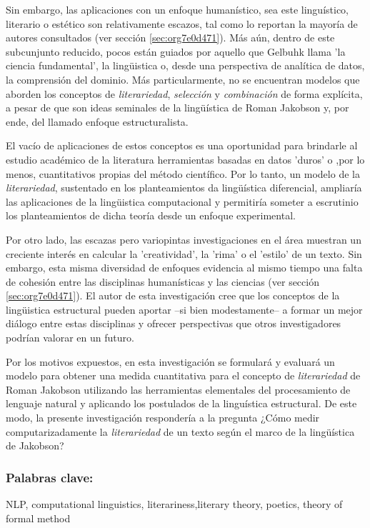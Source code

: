 \documentclass[12pt,letterpaper,twoside]{article}
\begin{document}
Sin embargo, las aplicaciones con un enfoque humanístico, sea este
linguístico, literario o estético son relativamente escazos, tal como
lo reportan la mayoría de autores consultados (ver sección \ref{sec:org7e0d471}).  Más aún, dentro de este subcunjunto reducido, pocos
están guiados por aquello que Gelbuhk llama 'la ciencia fundamental',
la lingüistica o, desde una perspectiva de analítica de datos, la
comprensión del dominio. Más particularmente, no se encuentran modelos
que aborden los conceptos de \emph{literariedad}, \emph{selección} y \emph{combinación}
de forma explícita, a pesar de que son ideas seminales de la lingüística
de Roman Jakobson y, por ende, del llamado enfoque estructuralista.

El vacío de aplicaciones de estos conceptos es una oportunidad para
brindarle al estudio académico de la literatura herramientas basadas
en datos 'duros' o ,por lo menos, cuantitativos propias del método
científico. Por lo tanto, un modelo de la \emph{literariedad}, sustentado
en los planteamientos da lingüística diferencial, ampliaría las
aplicaciones de la lingüistica computacional y permitiría someter a
escrutinio los planteamientos de dicha teoría desde un enfoque
experimental.

Por otro lado, las escazas pero variopintas investigaciones en el área
muestran un creciente interés en calcular la 'creatividad', la 'rima'
o el 'estilo' de un texto. Sin embargo, esta misma diversidad de
enfoques evidencia al mismo tiempo una falta de cohesión entre las
disciplinas humanísticas y las ciencias (ver sección \ref{sec:org7e0d471}). El autor de esta investigación cree que los conceptos de
la lingüistica estructural pueden aportar --si bien modestamente-- a
formar un mejor diálogo entre estas disciplinas y ofrecer perspectivas
que otros investigadores podrían valorar en un futuro.

Por los motivos expuestos, en esta investigación se formulará y
evaluará un modelo para obtener una medida cuantitativa para el
concepto de \emph{literariedad} de Roman Jakobson utilizando las
herramientas elementales del procesamiento de lenguaje natural y
aplicando los postulados de la linguística estructural. De este modo,
la presente investigación respondería a la pregunta ¿Cómo medir
computarizadamente la \emph{literariedad} de un texto según el marco de la
lingüística de Jakobson?

\subsubsection{\textbf{Palabras clave:}}
\label{sec:org6ef892a}
NLP, computational linguistics, literariness,literary theory, poetics, theory of formal method
\end{document}
